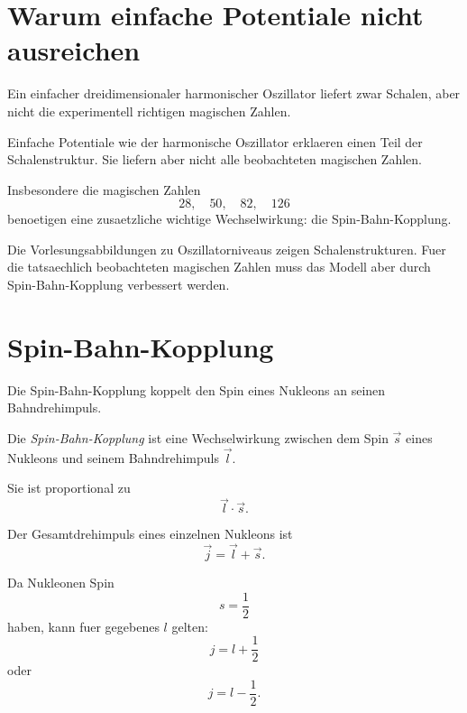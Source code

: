 \section{Warum einfache Potentiale nicht ausreichen}

Ein einfacher dreidimensionaler harmonischer Oszillator liefert zwar Schalen,
aber nicht die experimentell richtigen magischen Zahlen.

\begin{conceptbox}
Einfache Potentiale wie der harmonische Oszillator erklaeren einen Teil der
Schalenstruktur.
Sie liefern aber nicht alle beobachteten magischen Zahlen.

Insbesondere die magischen Zahlen
\begin{equation*}
    28,\quad 50,\quad 82,\quad 126
\end{equation*}
benoetigen eine zusaetzliche wichtige Wechselwirkung:
die Spin-Bahn-Kopplung.
\end{conceptbox}

\begin{notebox}
Die Vorlesungsabbildungen zu Oszillatorniveaus zeigen Schalenstrukturen.
Fuer die tatsaechlich beobachteten magischen Zahlen muss das Modell aber durch
Spin-Bahn-Kopplung verbessert werden.
\end{notebox}

\section{Spin-Bahn-Kopplung}

Die Spin-Bahn-Kopplung koppelt den Spin eines Nukleons an seinen Bahndrehimpuls.

\begin{definitionbox}
Die \emph{Spin-Bahn-Kopplung} ist eine Wechselwirkung zwischen dem Spin $\vec{s}$
eines Nukleons und seinem Bahndrehimpuls $\vec{l}$.

Sie ist proportional zu
\begin{equation*}
    \vec{l}\cdot\vec{s}.
\end{equation*}
\end{definitionbox}

\begin{conceptbox}
Der Gesamtdrehimpuls eines einzelnen Nukleons ist
\begin{equation*}
    \vec{j}=\vec{l}+\vec{s}.
\end{equation*}

Da Nukleonen Spin
\begin{equation*}
    s=\frac{1}{2}
\end{equation*}
haben, kann fuer gegebenes $l$ gelten:
\begin{equation*}
    j=l+\frac{1}{2}
\end{equation*}
oder
\begin{equation*}
    j=l-\frac{1}{2}.
\end{equation*}
\end{conceptbox}

